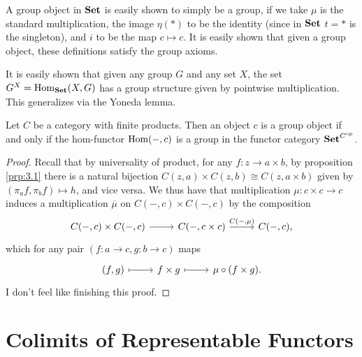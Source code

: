 A group object in $\mathbf{Set} $ is easily shown to simply be a group, if we take $\mu $ is the standard multiplication, the image $\eta (*)$ to be the identity (since in $\mathbf{Set} $ $t=*$ is the singleton), and $i$ to be the map $c\mapsto c$. It is easily shown that given a group object, these definitions satisfy the group axioms.

It is easily shown that given any group $G$ and any set $X$, the set $G^X=\operatorname{Hom}_{\mathbf{Set} }(X, G) $ has a group structure given by pointwise multiplication. This generalizes via the Yoneda lemma.

\begin{proposition}\label{prp:3.4}
	Let $C$ be a category with finite products. Then an object $c$ is a group object if and only if the hom-functor $\operatorname{Hom}(-, c) $ is a group in the functor category $\mathbf{Set} ^{C^{\mathrm{op} } } $.
\end{proposition}
\begin{proof}
	Recall that by universality of product, for any $f : z \to a\times b$, by proposition \ref{prp:3.1} there is a natural bijection $C(z,a)\times C(z,b)\cong C(z,a\times b)$ given by $(\pi _af,\pi_bf)\mapsto h$, and vice versa. We thus have that multiplication $\mu : c\times c \to c$ induces a multiplication $\overline{\mu } $ on $C(-,c)\times C(-,c)$ by the composition
	\[\begin{tikzcd}[row sep = 2.5em, column sep = 2.5em]
	C(-,c)\times C(-,c)\ar[r]  & C(-,c\times c)\ar[" C(-\text{,}\mu ) ", r]  & C(-,c),
	\end{tikzcd}\]
	which for any pair $(f : a \to c,g : b \to c)$ maps
	\[\begin{tikzcd}[row sep = 2.5em, column sep = 2.5em]
		(f,g)\ar[mapsto, r]  & f\times g\ar[mapsto, r]  & \mu \circ (f\times g).
	\end{tikzcd}\]
	I don't feel like finishing this proof.
\end{proof}

\section{Colimits of Representable Functors}

